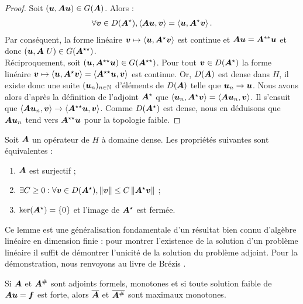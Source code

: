 \begin{proof}
	Soit $(\bm{u},\bm{A}\bm{u}) \in G(\bm{A})$. Alors :
	\begin{align}
		\forall \bm{v}\in D(\bm{A}^\star),
		\left\langle \bm{A} \bm{u} , \bm{v} \right\rangle =
		\left\langle \bm{u} , \bm{A}^\star \bm{v} \right\rangle .
	\end{align}
	Par conséquent, la forme linéaire $\bm{v} \mapsto
	\left\langle \bm{u} , \bm{A}^\star \bm{v} \right\rangle$
	est continue et $\bm{A} \bm{u} = \bm{A}^{**} \bm{u}$
	et donc $(\bm{u} , \bm{A}\ U) \in G(\bm{A}^{\star \star})$.
	\\
	Réciproquement, soit
	$(\bm{u} , \bm{A}^{\star \star} \bm{u}) \in G(\bm{A}^{\star \star})$.
	Pour tout $\bm{v} \in D(\bm{A}^\star)$
	la forme linéaire $\bm{v} \mapsto
	\left\langle \bm{u} , \bm{A}^\star \bm{v} \right\rangle =
	\left\langle \bm{A}^{\star \star} \bm{u} , \bm{v} \right\rangle$
	est continue. Or, $D(\bm{A})$ est dense dans $H$,
	il existe donc une suite $(\bm{u}_n)_{n \in \mathbb{N}}$
	d'éléments de $D(\bm{A})$ telle que $\bm{u}_n \rightarrow \bm{u}$.
	Nous avons alors d'après la définition de l'adjoint $\bm{A}^\star$
	que $\left\langle \bm{u}_n , \bm{A}^\star \bm{v} \right\rangle =
	\left\langle \bm{A} \bm{u}_n , \bm{v} \right\rangle$.
	Il s'ensuit que $\left\langle \bm{A} \bm{u}_n , \bm{v} \right\rangle \rightarrow
	\left\langle \bm{A}^{\star \star} \bm{u} , \bm{v} \right\rangle$.
	Comme $D(\bm{A}^\star)$ est dense, nous en déduisons que $\bm{A} \bm{u}_n$
	tend vers $\bm{A}^{\star \star} \bm{u}$ pour la topologie faible.
\end{proof}


\begin{lemma} \label{lem:cond_surj}
	Soit $\bm{A}$ un opérateur de $H$ à domaine dense.
	Les propriétés suivantes sont équivalentes :
	\begin{enumerate}
		\item $\bm{A}$	est surjectif ;
		\item $\exists C \ge 0 : \forall \bm{v} \in D(\bm{A}^\star),
			\left\Vert\bm{v}\right\Vert \le C \left\Vert\bm{A}^\star \bm{v}\right\Vert$ ;
		\item $\ker (\bm{A}^\star) = \lbrace 0 \rbrace$
			et l'image de $\bm{A}^\star$ est fermée.
	\end{enumerate}
\end{lemma}

Ce lemme est une généralisation fondamentale d'un résultat bien connu
d'algèbre linéaire en dimension finie : pour montrer l'existence de la
solution d'un problème linéaire il suffit de démontrer l'unicité de la
solution du problème adjoint.
Pour la démonstration, nous renvoyons au livre de Brézis \cite{brezis1983analyse}.

\begin{theorem}
	Si $\bm{A}$ et $\bm{A}^{\#}$ sont adjoints formels, monotones
	et si toute solution faible de $\bm{A} \bm{u} = \bm{f}$ est forte,
	alors $\overline{\bm{A}}$ et $\overline{\bm{A}^{\#}}$ sont maximaux monotones.
\end{theorem}

